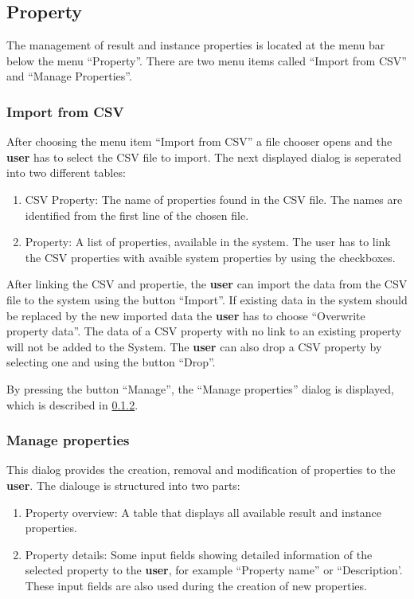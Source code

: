 \subsection{Property}
The management of result and instance properties is located at the menu bar below the menu ``Property''. There are two menu items called ``Import from CSV'' and ``Manage Properties''.

\subsubsection{Import from CSV}
After choosing the menu item ``Import from CSV''  a file chooser opens and the \textbf{user} has to select the CSV file to import. The next displayed dialog is seperated into two  different tables:
\begin{enumerate}
	\item CSV Property: The name of properties found in the CSV file. The names are identified from the first line of the chosen file.
	\item \edacc Property: A list of properties, available in the system. The user has to link the CSV properties with avaible system properties by using the checkboxes. 
\end{enumerate}

After linking the CSV and \edacc propertie, the \textbf{user} can import the data from the CSV file to the system using the button ``Import''. If existing data in the system should be replaced by the new imported data the \textbf{user} has to choose ``Overwrite property data''.
\attention The data of a CSV property with no link to an existing property will not be added to the System. The \textbf{user} can also drop a CSV property by selecting one and using the button ``Drop''.

By pressing the button ``Manage'', the ``Manage properties'' dialog is displayed, which is described in \ref{mangageProperties}. 

\subsubsection{Manage properties} \label{mangageProperties} 
This dialog provides  the creation, removal and modification of properties to the \textbf{user}. The dialouge is structured into two parts:
\begin{enumerate}
	\item Property overview: A table that displays all available result and instance properties.
	\item Property details: Some input fields showing detailed information of the selected property to the \textbf{user}, for example ``Property name'' or ``Description'. These input fields are also used during the creation of new properties. 
\end{enumerate}

